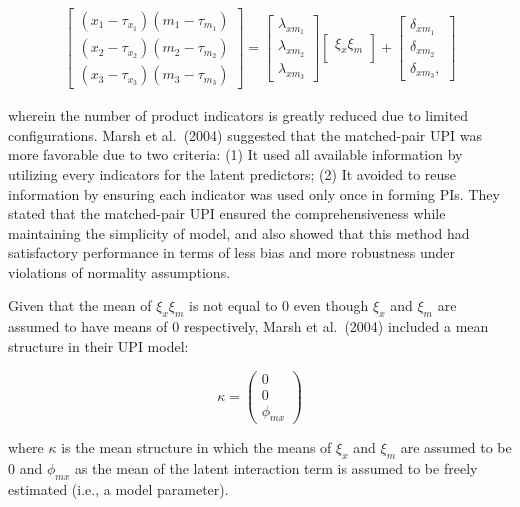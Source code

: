 \documentclass[
  man]{apa7}
\begin{document}
\begin{align}
    \begin{bmatrix}
        (x_{1} - \tau_{x_{1}})(m_{1} - \tau_{m_{1}}) \\
        (x_{2} - \tau_{x_{2}})(m_{2} - \tau_{m_{2}}) \\
        (x_{3} - \tau_{x_{3}})(m_{3} - \tau_{m_{3}})
    \end{bmatrix} =
    \begin{bmatrix}
        \lambda_{xm_{1}} \\
        \lambda_{xm_{2}} \\ 
        \lambda_{xm_{3}} 
    \end{bmatrix}
    \begin{bmatrix}
        \xi_{x}\xi_{m} \\
    \end{bmatrix} +
    \begin{bmatrix}
        \delta_{xm_{1}} \\
        \delta_{xm_{2}} \\ 
        \delta_{xm_{3}},
    \end{bmatrix}
\end{align}

wherein the number of product indicators is greatly reduced due to limited configurations. Marsh et al.~(2004) suggested that the matched-pair UPI was more favorable due to two criteria: (1) It used all available information by utilizing every indicators for the latent predictors; (2) It avoided to reuse information by ensuring each indicator was used only once in forming PIs. They stated that the matched-pair UPI ensured the comprehensiveness while maintaining the simplicity of model, and also showed that this method had satisfactory performance in terms of less bias and more robustness under violations of normality assumptions.

Given that the mean of \(\xi_{x}\xi_{m}\) is not equal to 0 even though \(\xi_{x}\) and \(\xi_{m}\) are assumed to have means of 0 respectively, Marsh et al.~(2004) included a mean structure in their UPI model:

\begin{equation}
  \kappa =
  \begin{pmatrix}
    0 \\
    0 \\
    \phi_{mx}
  \end{pmatrix}
\end{equation}

where \(\kappa\) is the mean structure in which the means of \(\xi_{x}\) and \(\xi_{m}\) are assumed to be 0 and \(\phi_{mx}\) as the mean of the latent interaction term is assumed to be freely estimated (i.e., a model parameter).
\end{document}
